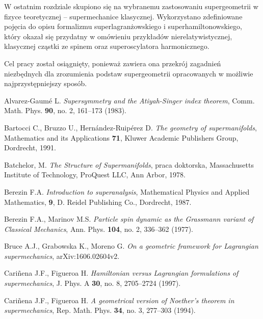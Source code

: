 \documentclass[11pt,a4paper]{report}
\theoremstyle{definition}
\begin{document}
W ostatnim rozdziale skupiono się na wybranemu zastosowaniu supergeometrii w fizyce teoretycznej -- supermechanice klasycznej. Wykorzystano zdefiniowane pojęcia do opisu formalizmu superlagranżowskiego i superhamiltonowskiego, który okazał się przydatny w omówieniu przykładów nierelatywistycznej, klasycznej cząstki ze spinem oraz superoscylatora harmonicznego.
			      				
Cel pracy został osiągnięty, ponieważ zawiera ona przekrój zagadnień niezbędnych dla zrozumienia podstaw supergeometrii opracowanych w możliwie najprzystępniejszy sposób.
			      				
\newpage
			      				
\begin{thebibliography}{}
						      					
	Alvarez-Gaumé L. \textit{Supersymmetry and the Atiyah-Singer index theorem}, Comm. Math. Phys. {\bf 90}, no. 2, 161--173 (1983).
						      					
	Bartocci C., Bruzzo U., Hernández-Ruipérez D. \textsl{The geometry of supermanifolds}, Mathematics and its Applications {\bf 71}, Kluwer Academic Publishers Group, Dordrecht, 1991.
						      					
	Batchelor, M. \textsl{The Structure of Supermanifolds}, praca doktorska, Massachusetts Institute of Technology, ProQuest LLC, Ann Arbor, 1978.
						      					
	Berezin F.A. \textsl{Introduction to superanalysis}, Mathematical Physics and Applied Mathematics, {\bf 9}, D. Reidel Publishing Co., Dordrecht, 1987.
						      					
	Berezin F.A., Marinov M.S. {\it Particle spin dynamic as the Grassmann variant of Classical Mechanics}, Ann. Phys. {\bf 104}, no. 2, 336--362 (1977).
						      					
	Bruce A.J., Grabowska K., Moreno G.
	{\it On a geometric framework for Lagrangian supermechanics},
	arXiv:1606.02604v2.
						      					
	Cariñena J.F., Figueroa H. \textit{Hamiltonian versus Lagrangian formulations of supermechanics}, J. Phys. A {\bf 30}, no. 8, 2705--2724 (1997).
						      					
	Cari\~nena J.F., Figueroa H. \textit{A geometrical version of Noether's theorem in supermechanics}, Rep. Math. Phys. {\bf 34}, no. 3, 277--303 (1994).
						      					

\end{thebibliography}
\end{document}
